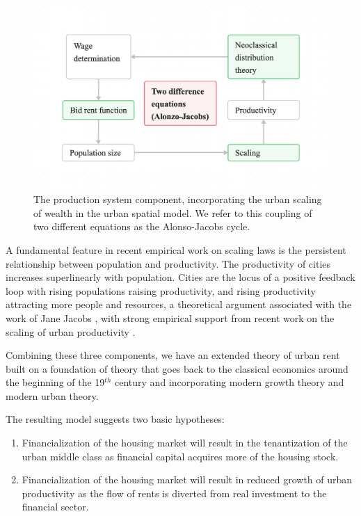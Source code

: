 \begin{figure}[!ht]
\centering
\includegraphics[scale=.2]{fig/flow_Alonzo-Jacobs_cycle.png}
\caption[The production system]{The production system component, incorporating the urban scaling of wealth in the urban spatial model. We refer to this coupling of two different equations as the Alonso-Jacobs cycle.}
\label{fig-alonso-jacobs-cycle}
\end{figure}

A fundamental feature in recent empirical work on scaling laws is the persistent relationship between population and productivity. The productivity of cities increases superlinearly with population. Cities are the locus of a positive feedback loop with rising populations raising productivity, and rising productivity attracting more people and resources, a theoretical argument associated with the work of Jane Jacobs \cite{jacobsEconomyCities1969}, with strong empirical support from recent work on the scaling of urban productivity  \cite{bettencourtGrowthInnovationScaling2007, bettencourtOriginsScalingCities2013, dongUnderstandingMesoscopicScaling2020, loboUrbanScalingProduction2013}.


Combining these three components, we have an extended theory of urban rent built on a foundation of theory that goes back to the \gls{classical economics} around the beginning of the 19$^{th}$ century and incorporating modern growth theory and modern urban theory. 

The resulting model suggests two basic hypotheses:
\begin{enumerate}
    \item Financialization of the housing market will result in the tenantization of the urban middle class as financial capital acquires more of the housing stock. %
    \item Financialization of the housing market will result in reduced growth of urban productivity as the flow of rents is diverted from real investment to the financial sector.
\end{enumerate} 
 
